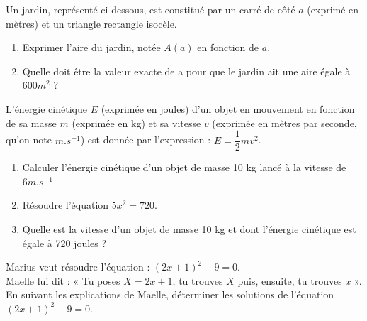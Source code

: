 {\begin{Exercice}
\end{Exercice}


\begin{Exercice}

Un jardin, représenté ci-dessous, est constitué par un carré de côté $ a $ (exprimé en mètres) et un triangle rectangle isocèle.\\
\begin{center}
\end{center}
\begin{enumerate}
\item Exprimer l'aire du jardin, notée $ A(a) $ en fonction de $ a $.
\item Quelle doit être la valeur exacte de a pour que le jardin ait une aire égale à $ 600 m^2 $ ?
\end{enumerate}

\end{Exercice}



\begin{Exercice}
L'énergie cinétique $ E $ (exprimée en joules) d'un objet en mouvement en fonction de sa masse $ m $ (exprimée en kg) et sa vitesse $ v $ (exprimée en mètres par seconde, qu'on note $ m.s^{-1} $) est donnée par l'expression : $  E=\dfrac{1}{2}mv^2$.
\begin{enumerate}
\item Calculer l'énergie cinétique d'un objet de masse 10 kg
lancé à la vitesse de $6 m.s^{-1} $
\item Résoudre l'équation  $ 5x^2 = 720 $.
\item Quelle est la vitesse d'un objet de masse 10 kg et dont l'énergie cinétique est égale à 720 joules ?
\end{enumerate}
\end{Exercice}

\begin{Exercice}

Marius veut résoudre l'équation : $ (2x +1)^2 - 9 = 0 $.\\

Maelle lui dit : « Tu poses $ X = 2x + 1 $, tu trouves $ X $ puis, ensuite, tu trouves $ x $ ».
En suivant les explications de Maelle, déterminer les solutions de l'équation $ (2x + 1)^2 - 9 = 0 $.
\end{Exercice}

}
